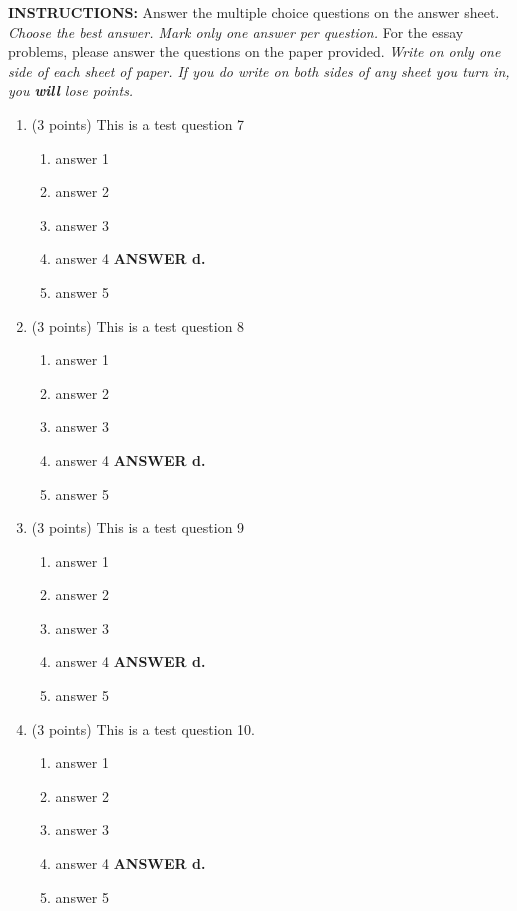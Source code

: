 \documentclass{article}
\newcommand{\ans}[1]{ \ifnum\showans=1 {\bf ANSWER #1.} \fi }
\begin{document}
{ \Large
\begin{center}
\end{center}
}

\vspace{.1in}

\noindent
{\Large\bf INSTRUCTIONS:} Answer the multiple choice questions on the
answer sheet.  {\em Choose the best answer.  Mark only one answer per
question.}  For the essay problems, please answer the questions on the
paper provided.  {\em Write on only one side of each sheet of paper.
If you do write on both sides of any sheet you turn in, you {\bf will}
lose points.}

\vspace{.1in}

\begin{enumerate}

\item (3 points) This is a test question 7
  \begin{enumerate}
  \item answer 1
  \item answer 2
  \item answer 3
  \item answer 4  \ans{d}
  \item answer 5
  \end{enumerate}

\item (3 points) This is a test question 8
  \begin{enumerate}
  \item answer 1
  \item answer 2
  \item answer 3
  \item answer 4  \ans{d}
  \item answer 5
  \end{enumerate}

\item (3 points) This is a test question 9
  \begin{enumerate}
  \item answer 1
  \item answer 2
  \item answer 3
  \item answer 4  \ans{d}
  \item answer 5
  \end{enumerate}

\item (3 points) This is a test question 10.
  \begin{enumerate}
  \item answer 1
  \item answer 2
  \item answer 3
  \item answer 4  \ans{d}
  \item answer 5
  \end{enumerate}


\end{enumerate}
\end{document}
